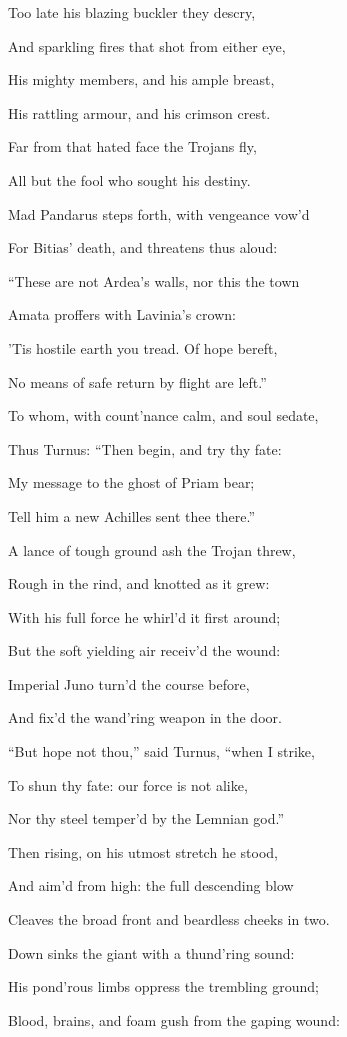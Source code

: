 Too late his blazing buckler they descry,

And sparkling fires that shot from either eye,

His mighty members, and his ample breast,

His rattling armour, and his crimson crest.

Far from that hated face the Trojans fly,

All but the fool who sought his destiny.

Mad Pandarus steps forth, with vengeance vow’d

For Bitias’ death, and threatens thus aloud:

“These are not Ardea’s walls, nor this the town

Amata proffers with Lavinia’s crown:

’Tis hostile earth you tread. Of hope bereft,

No means of safe return by flight are left.”

To whom, with count’nance calm, and soul sedate,

Thus Turnus: “Then begin, and try thy fate:

My message to the ghost of Priam bear;

Tell him a new Achilles sent thee there.”

A lance of tough ground ash the Trojan threw,

Rough in the rind, and knotted as it grew:

With his full force he whirl’d it first around;

But the soft yielding air receiv’d the wound:

Imperial Juno turn’d the course before,

And fix’d the wand’ring weapon in the door.

“But hope not thou,” said Turnus, “when I strike,

To shun thy fate: our force is not alike,

Nor thy steel temper’d by the Lemnian god.”

Then rising, on his utmost stretch he stood,

And aim’d from high: the full descending blow

Cleaves the broad front and beardless cheeks in two.

Down sinks the giant with a thund’ring sound:

His pond’rous limbs oppress the trembling ground;

Blood, brains, and foam gush from the gaping wound:

